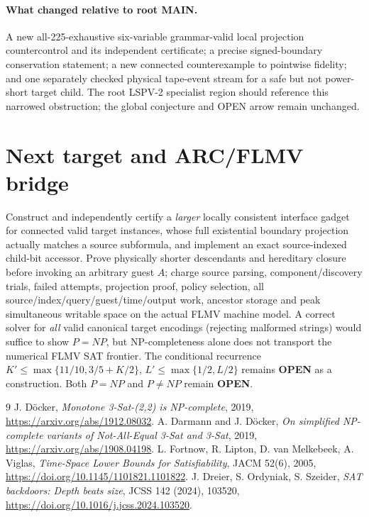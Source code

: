 \documentclass[11pt]{article}
\begin{document}
\paragraph{What changed relative to root MAIN.} A new all-225-exhaustive six-variable grammar-valid local projection countercontrol and its independent certificate; a precise signed-boundary conservation statement; a new connected counterexample to pointwise fidelity; and one separately checked physical tape-event stream for a safe but not power-short target child. The root LSPV-2 specialist region should reference this narrowed obstruction; the global conjecture and OPEN arrow remain unchanged.

\section{Next target and ARC/FLMV bridge}
Construct and independently certify a \emph{larger} locally consistent interface gadget for connected valid target instances, whose full existential boundary projection actually matches a source subformula, and implement an exact source-indexed child-bit accessor. Prove physically shorter descendants and hereditary closure before invoking an arbitrary guest $A$; charge source parsing, component/discovery trials, failed attempts, projection proof, policy selection, all source/index/query/guest/time/output work, ancestor storage and peak simultaneous writable space on the actual FLMV machine model. A correct solver for \emph{all} valid canonical target encodings (rejecting malformed strings) would suffice to show $P=NP$, but NP-completeness alone does not transport the numerical FLMV SAT frontier. The conditional recurrence $K'\le\max\{11/10,3/5+K/2\}$, $L'\le\max\{1/2,L/2\}$ remains \textbf{OPEN} as a construction. Both $P=NP$ and $P\ne NP$ remain \textbf{OPEN}.

\begin{thebibliography}{9}
 J. D\"ocker, \emph{Monotone 3-Sat-(2,2) is NP-complete}, 2019, \url{https://arxiv.org/abs/1912.08032}.
 A. Darmann and J. D\"ocker, \emph{On simplified NP-complete variants of Not-All-Equal 3-Sat and 3-Sat}, 2019, \url{https://arxiv.org/abs/1908.04198}.
 L. Fortnow, R. Lipton, D. van Melkebeek, A. Viglas, \emph{Time-Space Lower Bounds for Satisfiability}, JACM 52(6), 2005, \url{https://doi.org/10.1145/1101821.1101822}.
 J. Dreier, S. Ordyniak, S. Szeider, \emph{SAT backdoors: Depth beats size}, JCSS 142 (2024), 103520, \url{https://doi.org/10.1016/j.jcss.2024.103520}.
\end{thebibliography}
\end{document}
